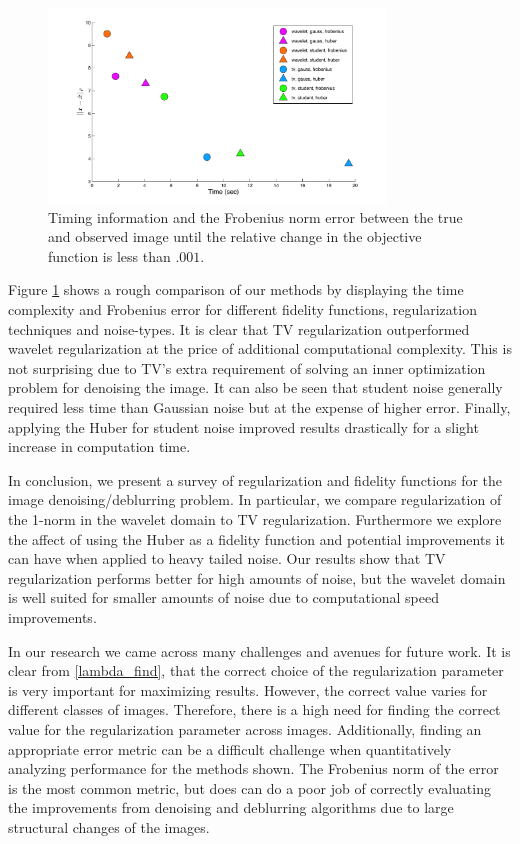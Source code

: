 \documentclass[10pt,a4paper]{article}
\begin{document}
\begin{figure}[H]
	
	\begin{center}
		\includegraphics[width=0.8\textwidth]{../figures/comparePlot2.pdf}
		\caption{Timing information and the Frobenius norm error between the true and observed image until the relative change in the objective function is less than $.001$. }
		\label{comp_methods}
	\end{center}
\end{figure}


Figure \ref{comp_methods} shows a rough comparison of our methods by displaying the time complexity and Frobenius error for different fidelity functions, regularization techniques and noise-types. It is clear that TV regularization outperformed wavelet regularization at the price of additional computational complexity. This is not surprising due to TV's extra requirement of solving an inner optimization problem for denoising the image. It can also be seen that student noise generally required less time than Gaussian noise but at the expense of higher error. Finally, applying the Huber for student noise improved results drastically for a slight increase in computation time.  

In conclusion, we present a survey of regularization and fidelity functions for the image denoising/deblurring problem. In particular, we compare regularization of the 1-norm in the wavelet domain to TV regularization. Furthermore we explore the affect of using the Huber as a fidelity function and potential improvements it can have when applied to heavy tailed noise. Our results show that TV regularization performs better for high amounts of noise, but the wavelet domain is well suited for smaller amounts of noise due to computational speed improvements. 

In our research we came across many challenges and avenues for future work. It is clear from \ref{lambda_find}, that the correct choice of the regularization parameter is very important for maximizing results. However, the correct value varies for different classes of images. Therefore, there is a high need for finding the correct value for the regularization parameter across images. Additionally, finding an appropriate error metric can be a difficult challenge when quantitatively analyzing performance for the methods shown. The Frobenius norm of the error is the most common metric, but does can do a poor job of correctly evaluating the improvements from denoising and deblurring algorithms due to large structural changes of the images. 







\end{document}
